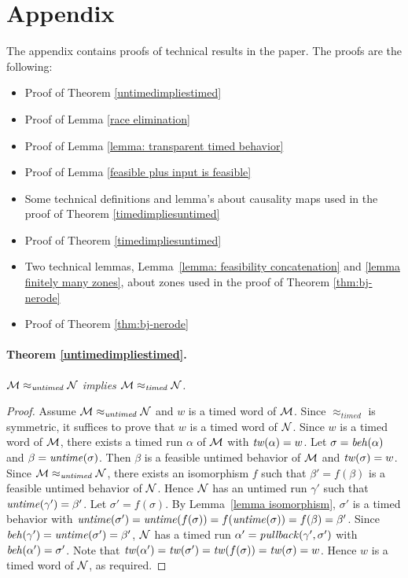 \section{Appendix}
The appendix contains proofs of technical results in the paper.
The proofs are the following:
\begin{itemize}
\item
Proof of Theorem \ref{untimedimpliestimed}
\item 
Proof of Lemma \ref{race elimination}
\item 
Proof of Lemma \ref{lemma: transparent timed behavior}
\item 
Proof of Lemma \ref{feasible plus input is feasible}
\item 
Some technical definitions and lemma's about causality maps used in the proof of
Theorem \ref{timedimpliesuntimed}
\item 
Proof of Theorem \ref{timedimpliesuntimed}
\item 
  Two technical lemmas, Lemma~\ref{lemma: feasibility concatenation} and
  \ref{lemma finitely many zones},
about zones used in the proof of Theorem \ref{thm:bj-nerode}
\item 
Proof of Theorem \ref{thm:bj-nerode}
\end{itemize}



\paragraph{Theorem \ref{untimedimpliestimed}.}
\emph{${\mathcal M} \approx_{\mathit{untimed}} {\mathcal N}$
implies
${\mathcal M} \approx_{\mathit{timed}} {\mathcal N}$.}

\begin{proof}
Assume ${\mathcal M} \approx_{\mathit{untimed}} {\mathcal N}$ and $w$ is a timed word of ${\mathcal M}$.
Since $\approx_{\mathit{timed}}$ is symmetric, it suffices to prove that $w$ is a timed word of ${\mathcal N}$.
Since $w$ is a timed word of ${\mathcal M}$,
there exists a timed run $\alpha$ of ${\mathcal M}$ with $\mathit{tw}(\alpha) = w$. 
Let $\sigma = \mathit{beh}(\alpha)$ and $\beta = \mathit{untime}(\sigma)$. 
Then $\beta$ is a feasible untimed behavior of ${\mathcal M}$ and $\mathit{tw}(\sigma) = w$.
Since  ${\mathcal M} \approx_{\mathit{untimed}} {\mathcal N}$, there exists an isomorphism $f$ such that 
$\beta' = f(\beta)$ is a feasible untimed behavior of ${\mathcal N}$.
Hence ${\mathcal N}$ has an untimed run $\gamma'$ such that $\mathit{untime}(\gamma') = \beta'$.
Let $\sigma' = f(\sigma)$.
By Lemma~\ref{lemma isomorphism}, $\sigma'$ is a timed behavior with 
$\mathit{untime}(\sigma') = \mathit{untime}(f(\sigma)) = f(\mathit{untime}(\sigma)) = f(\beta) = \beta'$.
Since $\mathit{beh}(\gamma') = \mathit{untime}(\sigma') = \beta'$, ${\mathcal N}$ has a timed run $\alpha' = \mathit{pullback}(\gamma',\sigma')$ with
$\mathit{beh}(\alpha') = \sigma'$.
Note that $\mathit{tw}(\alpha') = \mathit{tw}(\sigma') = \mathit{tw}(f(\sigma)) = \mathit{tw}(\sigma) = w$.
Hence $w$ is a timed word of ${\mathcal N}$, as required.
\end{proof}

